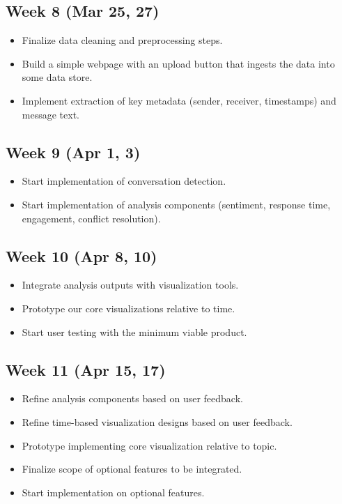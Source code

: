 \documentclass{article}\usepackage{graphicx}
\begin{document}
\subsection*{Week 8 (Mar 25, 27)}
\begin{itemize}
    \item Finalize data cleaning and preprocessing steps.
    \item Build a simple webpage with an upload button that ingests the data into some data store.
    \item Implement extraction of key metadata (sender, receiver, timestamps) and message text.
\end{itemize}

\subsection*{Week 9 (Apr 1, 3)}
\begin{itemize}
    \item Start implementation of conversation detection.
    \item Start implementation of analysis components (sentiment, response time, engagement, conflict resolution).
\end{itemize}

\subsection*{Week 10 (Apr 8, 10)}
\begin{itemize}
    \item Integrate analysis outputs with visualization tools.
    \item Prototype our core visualizations relative to time.
    \item Start user testing with the minimum viable product.
\end{itemize}

\subsection*{Week 11 (Apr 15, 17)}
\begin{itemize}
    \item Refine analysis components based on user feedback.
    \item Refine time-based visualization designs based on user feedback.
    \item Prototype implementing core visualization relative to topic.
    \item Finalize scope of optional features to be integrated.
    \item Start implementation on optional features.
\end{itemize}
\end{document}
